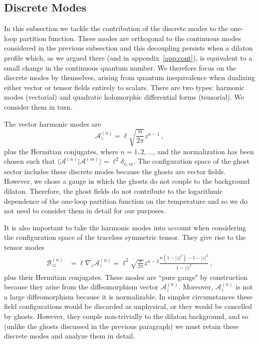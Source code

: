 \documentclass[12pt]{article}
\begin{document}
\subsection{Discrete Modes}
\label{sec:oneloop:harm}

In this subsection we tackle the contribution of the discrete modes to the one-loop partition function. These modes are orthogonal to the continuous modes considered in the previous subsection and this decoupling persists when a dilaton profile which, as we argued there (and in appendix~\ref{app:cont}), is equivalent to a small change in the continuous quantum number.  We therefore focus on the discrete modes by themselves, arising from quantum inequivalence when dualizing either vector or tensor fields entirely to scalars. There are two types: harmonic modes (vectorial) and quadratic holomorphic differential forms (tensorial). We consider them in turn. 

The vector harmonic modes are 
\begin{equation}
	\mathcal{A}_z^{(n)} = \ell\sqrt{\frac{n}{2\pi}} z^{n-1}~,
\end{equation}
plus the Hermitian conjugates, where $n= 1, 2,\ldots$, and the normalization has been chosen such that $\langle \mathcal{A}^{(n)} | \mathcal{A}^{(m)}\rangle = \ell^2 \delta_{n,m}$.  The configuration space of the ghost sector includes these discrete modes because the ghosts are vector fields. However, we chose a gauge in which the ghosts do not couple to the background dilaton. Therefore, the ghost fields do not contribute to the logarithmic dependence of the one-loop partition function on the temperature and so we do not need to consider them in detail for our purposes. 

It is also important to take the harmonic modes into account when considering the configuration space of the traceless symmetric tensor. They give rise to the tensor modes
\begin{equation}\begin{aligned}
	\mathcal{B}^{(n)}_{zz} &= \ell\nabla_z \mathcal{A}^{(n)}_z = \ell^2\sqrt{\frac{n}{2\pi}} z^{n-2} \frac{n(1-|z|^2)-1-|z|^2}{1-|z|^2}~,
	\label{eqn:Bzztensor}
\end{aligned}\end{equation}
plus their Hermitian conjugates. These modes are ``pure gauge" by construction because they arise from the diffeomorphism vector $\mathcal{A}_z^{(n)}$. Moreover, $\mathcal{A}_z^{(n)}$ is not a large diffeomorphism because it is normalizable. In simpler circumstances these field configurations would be discarded as unphysical, or they would be cancelled by ghosts. However, they couple non-trivially to the dilaton background, and so (unlike the ghosts discussed in the previous paragraph) we must retain these discrete modes and analyze them in detail. 
\end{document}
